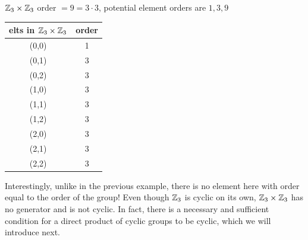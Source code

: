 \begin{example}
    ${\mathbb{Z}}_3\times {\mathbb{Z}}_3$ order $=9=3\cdot 3$, potential element orders are $1, 3, 9$
    \begin{table}[ht!]
    \centering
    \begin{tabular}{c|c}
         elts in ${\mathbb{Z}}_3\times {\mathbb{Z}}_3$& order   \\ \hline
         (0,0) & 1 \\
         (0,1) & 3 \\
         (0,2) & 3 \\
         (1,0) & 3 \\
         (1,1) & 3 \\
         (1,2) & 3 \\
         (2,0) & 3 \\
         (2,1) & 3 \\
         (2,2) & 3
    \end{tabular}
    \label{tab:elts_Z3_cross_Z3}
\end{table}
Interestingly, unlike in the previous example, there is no element here with order equal to the
order of the group! Even though ${\mathbb{Z}}_3$ is cyclic on its own, ${\mathbb{Z}}_3\times {\mathbb{Z}}_3$ has no generator and
is not cyclic. In fact, there is a necessary and sufficient condition for a direct product of cyclic
groups to be cyclic, which we will introduce next.
\end{example}
\newpage

